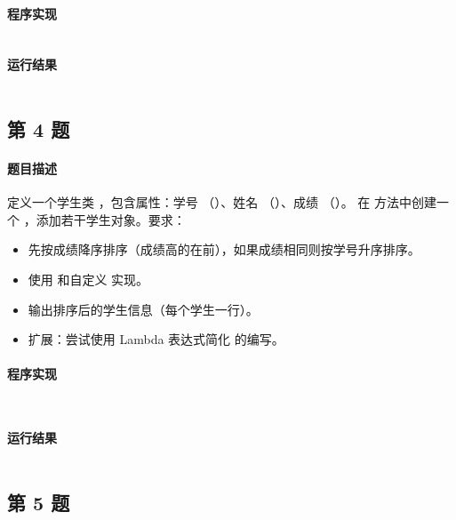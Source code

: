 \documentclass{academics}
\begin{document}
\paragraph{程序实现} {
    \inputminted[label=WordCount.java]{java}{../src/P03/WordCount.java}
}

\paragraph{运行结果} {
    \inputminted{text}{../res/P03.out}
}

\subsection{第 4 题}

\paragraph{题目描述} {
    定义一个学生类 ，包含属性：学号 （）、姓名 （）、成绩 （）。
    在  方法中创建一个 ，添加若干学生对象。要求：
    \begin{itemize}
        \item 先按成绩降序排序（成绩高的在前），如果成绩相同则按学号升序排序。
        \item 使用  和自定义  实现。
        \item 输出排序后的学生信息（每个学生一行）。
        \item 扩展：尝试使用 Lambda 表达式简化  的编写。
    \end{itemize}
}

\paragraph{程序实现} {
    \inputminted[label=Student.java]{java}{../src/P04/Student.java}
    \inputminted[label=StudentSort.java]{java}{../src/P04/StudentSort.java}
}

\paragraph{运行结果} {
    \inputminted{text}{../res/P04.out}
}

\subsection{第 5 题}
\end{document}
